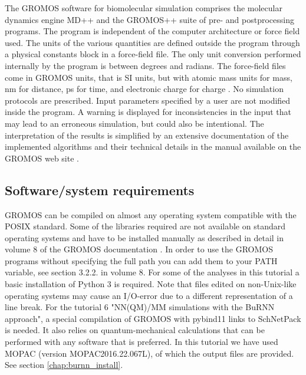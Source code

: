 The GROMOS software for biomolecular simulation comprises the molecular dynamics engine MD++ and the \linebreak GROMOS++ suite of pre- and postprocessing programs. The program is independent of the computer architecture or force field used. 
The units of the various quantities are defined outside the program through a physical constants block in a force-field file. The only unit conversion performed internally by the program is between degrees and radians. The force-field files come 
in GROMOS units, that is SI units, but with atomic mass units for mass, nm for distance, ps for time, and electronic charge for charge \cite{volume_6}. No simulation protocols are prescribed. 
Input parameters specified by a user are not modified inside 
the program. %
A warning is displayed for inconsistencies in the input that may lead to an erroneous simulation, but could also be intentional.
The interpretation of the results is simplified by an extensive 
documentation of the implemented algorithms and their technical details 
in the manual available on the GROMOS web site \cite{volume_6,volume_2}.

\subsection{Software/system requirements}
%
GROMOS can be compiled on almost any operating system compatible with the POSIX standard.
 Some of the libraries required are not available on standard operating systems and have to be installed 
manually as described in detail in volume 8 of the GROMOS documentation \cite{volume_8}. 
In order to use the GROMOS programs without specifying the full path you can add them to your PATH variable, see section 3.2.2. in volume 8.
For some of the analyses in this tutorial a basic installation of Python 3 is required. 
Note that files edited on non-Unix-like operating systems may cause an I/O-error due to a different representation of a line break. For the tutorial 6 "NN(QM)/MM simulations with the BuRNN approach", a special compilation of GROMOS with pybind11 links to SchNetPack is needed. It also relies on quantum-mechanical calculations that can be performed with any software that is preferred. In this tutorial we have used MOPAC (version MOPAC2016.22.067L), of which the output files are provided. See section \ref{chap:burnn_install}. 


